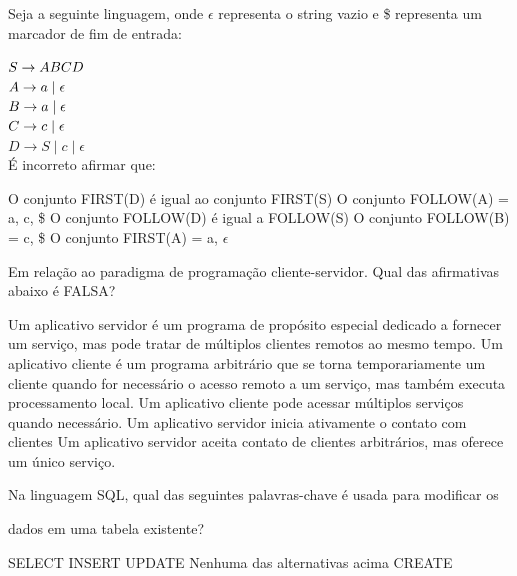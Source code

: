 \documentclass[12pt, addpoints]{exam}
\begin{document}
\begin{questions}
\question

Seja a seguinte linguagem, onde \(\epsilon\) representa o string vazio e \$ representa um marcador de fim de entrada:



$S \rightarrow ABCD \\$\\

$A \rightarrow a \mid \epsilon \\$\\

$B \rightarrow a \mid \epsilon \\$\\

$C \rightarrow c \mid \epsilon \\$\\

$D \rightarrow S \mid c \mid \epsilon$\\



É incorreto afirmar que:
\begin{choices}
\choice O conjunto FIRST(D) é igual ao conjunto FIRST(S)
\choice O conjunto FOLLOW(A) = a, c, \$
\choice O conjunto FOLLOW(D) é igual a FOLLOW(S)
\choice O conjunto FOLLOW(B) = c, \$
\choice O conjunto FIRST(A) = a, \(\epsilon\)
\end{choices}

\question

Em relação ao paradigma de programação cliente-servidor. Qual das afirmativas abaixo é FALSA?
\begin{choices}
\choice Um aplicativo servidor é um programa de propósito especial dedicado a fornecer um serviço, mas pode tratar de múltiplos clientes remotos ao mesmo tempo. 
\choice Um aplicativo cliente é um programa arbitrário que se torna temporariamente um cliente quando for necessário o acesso remoto a um serviço, mas também executa processamento local.
\choice Um aplicativo cliente pode acessar múltiplos serviços quando necessário.
\choice Um aplicativo servidor inicia ativamente o contato com clientes 
\choice Um aplicativo servidor aceita contato de clientes arbitrários, mas oferece um único serviço. 
\end{choices}

\question

Na linguagem SQL, qual das seguintes palavras-chave é usada para modificar os

dados em uma tabela existente?


\begin{choices}
\choice SELECT
\choice INSERT
\choice UPDATE
\choice Nenhuma das alternativas acima
\choice CREATE
\end{choices}


\end{questions}
\end{document}
